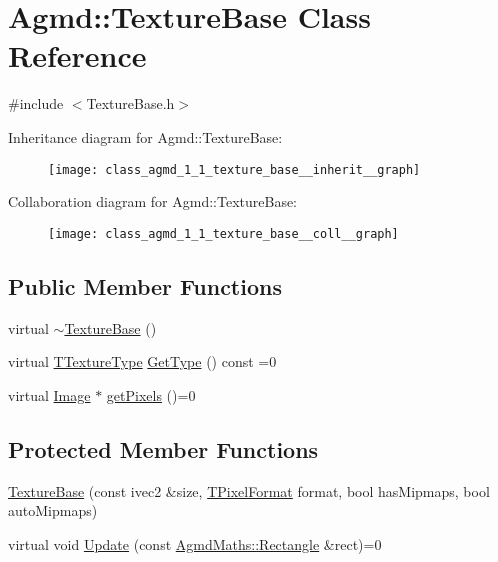 \hypertarget{class_agmd_1_1_texture_base}{\section{Agmd\+:\+:Texture\+Base Class Reference}
\label{class_agmd_1_1_texture_base}
}


{\ttfamily \#include $<$Texture\+Base.\+h$>$}



Inheritance diagram for Agmd\+:\+:Texture\+Base\+:\nopagebreak
\begin{figure}[H]
\begin{center}
\leavevmode
\texttt{[image: class\_agmd\_1\_1\_texture\_base\_\_inherit\_\_graph]}
\end{center}
\end{figure}


Collaboration diagram for Agmd\+:\+:Texture\+Base\+:\nopagebreak
\begin{figure}[H]
\begin{center}
\leavevmode
\texttt{[image: class\_agmd\_1\_1\_texture\_base\_\_coll\_\_graph]}
\end{center}
\end{figure}
\subsection*{Public Member Functions}
\begin{DoxyCompactItemize}
\item 
virtual \hyperlink{class_agmd_1_1_texture_base_a1056c402d6492e0987048228ec202759}{$\sim$\+Texture\+Base} ()
\item 
virtual \hyperlink{namespace_agmd_a7036bece09449a930cfec410f75e85f4}{T\+Texture\+Type} \hyperlink{class_agmd_1_1_texture_base_a09d3fb79e614d63ff8b1fe8ab9d7b087}{Get\+Type} () const =0
\item 
virtual \hyperlink{class_agmd_1_1_image}{Image} $\ast$ \hyperlink{class_agmd_1_1_texture_base_a1fddab81033407095a56833613aa53f7}{get\+Pixels} ()=0
\end{DoxyCompactItemize}
\subsection*{Protected Member Functions}
\begin{DoxyCompactItemize}
\item 
\hyperlink{class_agmd_1_1_texture_base_a44da6a4d051066875158bbe5ccfea222}{Texture\+Base} (const ivec2 \&size, \hyperlink{namespace_agmd_afc48fd9fa5dccb4c5621c052bfd1a7ec}{T\+Pixel\+Format} format, bool has\+Mipmaps, bool auto\+Mipmaps)
\item 
virtual void \hyperlink{class_agmd_1_1_texture_base_a71255f73d1d0cef7748db0e35f66df36}{Update} (const \hyperlink{class_agmd_maths_1_1_rectangle}{Agmd\+Maths\+::\+Rectangle} \&rect)=0
\end{DoxyCompactItemize}
